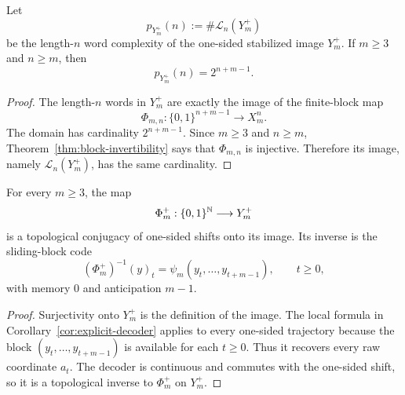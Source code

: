 \begin{corollary}\label{cor:one-sided-complexity}
Let
\[
p_{Y_m^+}(n):=\#\mathcal L_n(Y_m^+)
\]
be the length-$n$ word complexity of the one-sided stabilized image
$Y_m^+$.  If $m\ge3$ and $n\ge m$, then
\[
p_{Y_m^+}(n)=2^{n+m-1}.
\]
\end{corollary}

\begin{proof}
The length-$n$ words in $Y_m^+$ are exactly the image of the finite-block map
\[
\Phi_{m,n}:\{0,1\}^{n+m-1}\to X_m^n.
\]
The domain has cardinality $2^{n+m-1}$.  Since $m\ge3$ and $n\ge m$,
Theorem~\ref{thm:block-invertibility} says that $\Phi_{m,n}$ is injective.
Therefore its image, namely $\mathcal L_n(Y_m^+)$, has the same cardinality.
\end{proof}

\begin{corollary}\label{cor:one-sided-conjugacy}
For every $m\ge3$, the map
\[
\Phi_m^+:\{0,1\}^{\mathbb{N}}\longrightarrow Y_m^+
\]
is a topological conjugacy of one-sided shifts onto its image.  Its inverse is
the sliding-block code
\[
(\Phi_m^+)^{-1}(y)_t=\psi_m(y_t,\ldots,y_{t+m-1}),
\qquad t\ge0,
\]
with memory $0$ and anticipation $m-1$.
\end{corollary}

\begin{proof}
Surjectivity onto $Y_m^+$ is the definition of the image.  The local formula
in Corollary~\ref{cor:explicit-decoder} applies to every one-sided trajectory
because the block $(y_t,\ldots,y_{t+m-1})$ is available for each $t\ge0$.
Thus it recovers every raw coordinate $a_t$.  The decoder is continuous and
commutes with the one-sided shift, so it is a topological inverse to
$\Phi_m^+$ on $Y_m^+$.
\end{proof}

